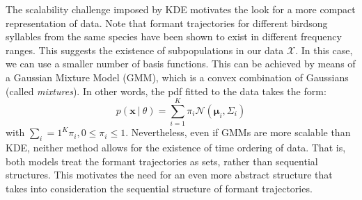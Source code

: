 \documentclass[pdftex,11pt,a4paper]{article}
\theoremstyle{definition}
\theoremstyle{remark}
\newcommand*{\V}[1]{\mathbf{#1}}%
\newcommand\given[1][]{\:#1\vert\:}
\begin{document}
\label{subsection_gmm}
The scalability challenge imposed by KDE motivates the look for a more compact representation of data. Note that formant trajectories for different birdsong syllables from the same species have been shown to exist in different frequency ranges. This suggests the existence of subpopulations in our data $\mathcal{X}$. In this case, we can use a smaller number of basis functions. This can be achieved by means of a Gaussian Mixture Model (GMM), which is a convex combination of Gaussians (called \emph{mixtures}). In other words, the pdf fitted to the data takes the form:
\begin{equation} \label{eq:mixmod}
p(\V{x} \given \theta ) = \sum_{i=1}^K\pi_i \mathcal{N}(\V{\mu}_i, \Sigma_i) 
\end{equation}
with $\sum_i=1^K\pi_i, 0 \leq \pi_i\leq 1$. Nevertheless, even if GMMs are more scalable than KDE, neither method allows for the existence of time ordering of data. That is, both models treat the formant trajectories as sets, rather than sequential structures. This motivates the need for an even more abstract structure that takes into consideration the sequential structure of formant trajectories.
\end{document}
